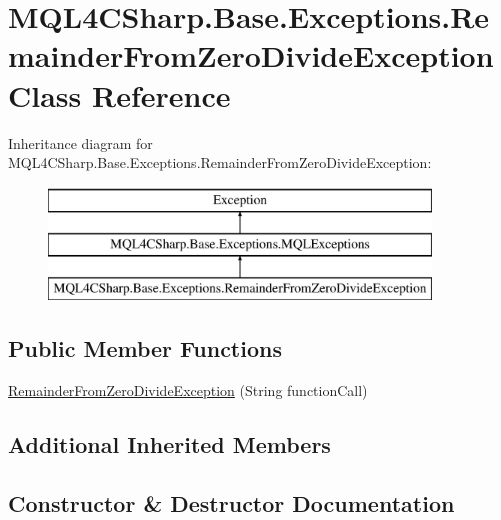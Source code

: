 \hypertarget{class_m_q_l4_c_sharp_1_1_base_1_1_exceptions_1_1_remainder_from_zero_divide_exception}{}\section{M\+Q\+L4\+C\+Sharp.\+Base.\+Exceptions.\+Remainder\+From\+Zero\+Divide\+Exception Class Reference}
\label{class_m_q_l4_c_sharp_1_1_base_1_1_exceptions_1_1_remainder_from_zero_divide_exception}
Inheritance diagram for M\+Q\+L4\+C\+Sharp.\+Base.\+Exceptions.\+Remainder\+From\+Zero\+Divide\+Exception\+:\begin{figure}[H]
\begin{center}
\leavevmode
\includegraphics[height=3.000000cm]{class_m_q_l4_c_sharp_1_1_base_1_1_exceptions_1_1_remainder_from_zero_divide_exception}
\end{center}
\end{figure}
\subsection*{Public Member Functions}
\begin{DoxyCompactItemize}
\item 
\hyperlink{class_m_q_l4_c_sharp_1_1_base_1_1_exceptions_1_1_remainder_from_zero_divide_exception_a1d4fab672b8b6936007ce6fcf7463b17}{Remainder\+From\+Zero\+Divide\+Exception} (String function\+Call)
\end{DoxyCompactItemize}
\subsection*{Additional Inherited Members}


\subsection{Constructor \& Destructor Documentation}

